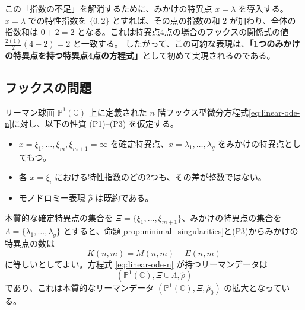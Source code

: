 この「指数の不足」を解消するために、みかけの特異点 $x=\lambda$ を導入する。$x=\lambda$ での特性指数を $\{0, 2\}$ とすれば、その点の指数の和 $2$ が加わり、全体の指数和は $0 + 2 = 2$ となる。これは特異点4点の場合のフックスの関係式の値 $\frac{2(1)}{2}(4-2) = 2$ と一致する。
したがって、この可約な表現は、\textbf{「1つのみかけの特異点を持つ特異点4点の方程式」}として初めて実現されるのである。

\subsection{フックスの問題}

リーマン球面 $\mathbb{P}^{1}(\mathbb{C})$ 上に定義された $n$ 階フックス型微分方程式\eqref{eq:linear-ode-n}に対し、以下の性質 (P1)--(P3) を仮定する。

\begin{itemize}
    \item[(P1)] $x=\xi_{1}, \dots, \xi_{m}, \xi_{m+1}=\infty$ を確定特異点、$x=\lambda_{1}, \dots, \lambda_{g}$ をみかけの特異点としてもつ。
    \item[(P2)] 各 $x=\xi_{i}$ における特性指数のどの2つも、その差が整数ではない。
    \item[(P3)] モノドロミー表現 $\hat{\rho}$ は既約である。
\end{itemize}

本質的な確定特異点の集合を $\Xi = \{\xi_{1}, \dots, \xi_{m+1}\}$、みかけの特異点の集合を $\Lambda = \{\lambda_{1}, \dots, \lambda_{g}\}$ とすると、命題\ref{prop:minimal_singularities}と(P3)からみかけの特異点の数は
\[
K(n,m)=M(n,m)-E(n,m)
\]
に等しいとしてよい。方程式 \eqref{eq:linear-ode-n} が持つリーマンデータは
\[
(\mathbb{P}^{1}(\mathbb{C}), \Xi \cup \Lambda, \hat{\rho})
\]
であり、これは本質的なリーマンデータ $(\mathbb{P}^{1}(\mathbb{C}), \Xi, \hat{\rho}_{0})$ の拡大となっている。

